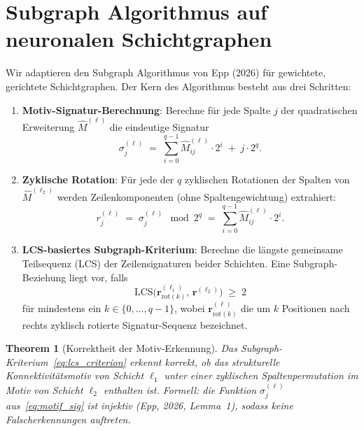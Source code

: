 ﻿\documentclass[12pt, a4paper, openany]{report}
\newtheorem{theorem}{Theorem}[chapter]
\begin{document}
\section{Subgraph Algorithmus auf neuronalen Schichtgraphen}
\label{sec:sgkr_algo}

Wir adaptieren den Subgraph Algorithmus von Epp (2026) für gewichtete,
gerichtete Schichtgraphen.  Der Kern des Algorithmus besteht aus drei
Schritten:

\begin{enumerate}[label=(\Roman*)]
  \item \textbf{Motiv-Signatur-Berechnung}: Berechne für jede Spalte $j$
    der quadratischen Erweiterung $\hat{M}^{(\ell)}$ die eindeutige
    Signatur
    \begin{equation}
      \label{eq:motif_sig}
      \sigma_j^{(\ell)}
      \;=\;
      \sum_{i=0}^{q-1} \hat{M}^{(\ell)}_{ij} \cdot 2^i
      \;+\; j \cdot 2^q.
    \end{equation}
  \item \textbf{Zyklische Rotation}: Für jede der $q$ zyklischen
    Rotationen der Spalten von $\hat{M}^{(\ell_2)}$ werden
    Zeilenkomponenten (ohne Spalten\-gewichtung) extrahiert:
    \begin{equation}
      \label{eq:row_sig}
      r_j^{(\ell)}
      \;=\; \sigma_j^{(\ell)} \!\!\mod 2^q
      \;=\; \sum_{i=0}^{q-1} \hat{M}^{(\ell)}_{ij} \cdot 2^i.
    \end{equation}
  \item \textbf{LCS-basiertes Subgraph-Kriterium}: Berechne die
    längste gemeinsame Teilsequenz (LCS) der Zeilen\-signaturen beider
    Schichten.  Eine Subgraph-Beziehung liegt vor, falls
    \begin{equation}
      \label{eq:lcs_criterion}
      \mathrm{LCS}\!\bigl(\bm{r}^{(\ell_1)}_{\mathrm{rot}(k)},\,
                          \bm{r}^{(\ell_2)}\bigr)
      \;\geq\; 2
    \end{equation}
    für mindestens ein $k \in \{0,\ldots,q-1\}$, wobei
    $\bm{r}^{(\ell)}_{\mathrm{rot}(k)}$ die um $k$ Positionen nach rechts
    zyklisch rotierte Signatur-Sequenz bezeichnet.
\end{enumerate}

\begin{theorem}[Korrektheit der Motiv-Erkennung]
\label{thm:motif_correctness}
Das Subgraph-Kriterium~\eqref{eq:lcs_criterion} erkennt korrekt, ob das
strukturelle Konnektivitätsmotiv von Schicht $\ell_1$ unter einer zyklischen
Spaltenpermutation im Motiv von Schicht $\ell_2$ enthalten ist.  Formell: die
Funktion $\sigma_j^{(\ell)}$ aus~\eqref{eq:motif_sig} ist injektiv (Epp, 2026,
Lemma~1), sodass keine Falscherkennungen auftreten.
\end{theorem}
\end{document}
